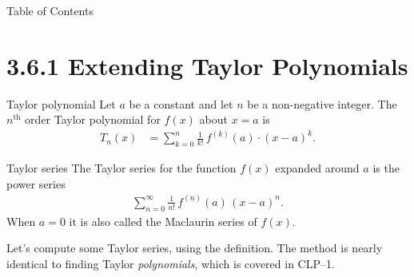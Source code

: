 

 \begin{frame}{Table of Contents }
\mapofcontentsC{\cf}
 \end{frame}
\section{3.6.1 Extending Taylor Polynomials}

\newcommand{\taylorblock}{\begin{block}{Taylor series}
The Taylor series for the function $f(x)$ expanded around $a$
is the power series
\begin{align*}
\sum_{n=0}^\infty \frac{1}{n!}\,f^{(n)}(a)\, (x-a)^n.
\end{align*}
When $a=0$ it is also called the Maclaurin series of $f(x)$. 
\end{block}}

\begin{frame}[t]

\begin{block}{Taylor polynomial}
  Let $a$ be a constant and let $n$ be a non-negative integer. The $n^\mathrm{th}$
order Taylor polynomial for $f(x)$ about $x=a$ is
\begin{align*}
  T_n(x) &= \sum_{k=0}^n \frac{1}{k!}\, f^{(k)}(a) \cdot (x-a)^k.
\end{align*}
\end{block}\pause

\taylorblock

\end{frame}

\begin{frame}
Let's compute some Taylor series, using the definition.
\vfill
The method is nearly identical to finding Taylor \textit{polynomials}, which is covered in CLP--1.
\end{frame}

